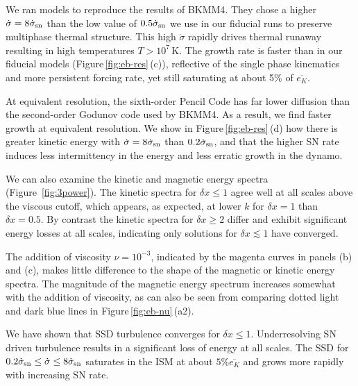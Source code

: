 \documentclass[preprint2]{aastex63}
\newcommand\SNr{\dot\sigma_{\rm sn}}
\newcommand\Ms{M_{\rm s}}
\newcommand\dx{ {\delta x}}
\newcommand\BKM{{\sf BKMM4}}
\newcommand{\fg}[1]{\textcolor{mypurple}{#1}}
\begin{document}
 \fg{We ran models to reproduce the results of \BKM. They chose a higher
 $\dot\sigma = 8\SNr$ than the low value of $0.5\SNr$ we use in our
   fiducial runs} to preserve multiphase thermal structure.
 This high $\dot\sigma$ rapidly drives thermal runaway resulting in high
 temperatures $T>10^7$\,K.
 The growth rate is faster {than in our fiducial models} (Figure\,\ref{fig:eb-res}\,(c)), reflective of the
 single phase kinematics and more persistent forcing rate, yet {still}
 saturating at about 5\% of $\overline{e_K}$.
 {At equivalent resolution, the sixth-order Pencil Code has far lower diffusion
 than the second-order Godunov code used by \BKM. As a result, we find faster
 growth at equivalent resolution.
 \fg{We show in Figure\,\ref{fig:eb-res}\,(d) how there is greater kinetic
 energy with $\dot\sigma=8\SNr$ than $0.2\SNr$, and that the higher SN rate
 induces less intermittency in the energy and less erratic growth in the
 dynamo.} 
 

 We can also examine the
      \fg{kinetic and magnetic}
   energy spectra (Figure~\ref{fig:3power}).
   The kinetic spectra
   for $\dx\leq1$ agree well at 
 all scales above the viscous cutoff, which appears, as expected, at lower $k$ for
 $\dx=1$ than $\dx=0.5$.
 By contrast the kinetic spectra for $\dx\geq2$ differ and exhibit significant
 energy losses at all scales,    
 indicating only solutions for $\dx\lesssim1$ have converged.

 {The addition of viscosity $\nu=10^{-3}$, indicated by the magenta curves in
 panels (b) and (c), {makes little difference to the shape of the
   magnetic or kinetic energy spectra.  The magnitude of the magnetic
   energy spectrum increases somewhat with the addition of viscosity,
   as can also be seen from comparing dotted light and dark blue
   lines in Figure\,\ref{fig:eb-nu}\,(a2).}
   }

 {We have shown that SSD turbulence {converges} for $\dx\leq1$.
 Underresolving SN driven turbulence results in a significant loss of energy
 at all scales. {The}
 SSD for $0.2\SNr\leq \dot\sigma \leq 8\SNr$ saturates in the ISM at about
 $5\%\overline{e_K}$ and grows more rapidly with increasing SN rate.
 } 

}
\end{document}
